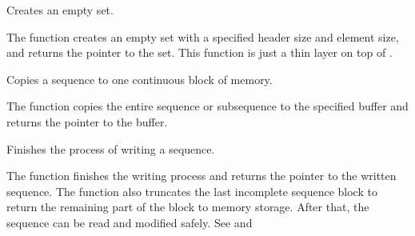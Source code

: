 Creates an empty set.


\begin{description}
\end{description}

The function creates an empty set with a specified header size and element size, and returns the pointer to the set. This function is just a thin layer on top of .

Copies a sequence to one continuous block of memory.


\begin{description}
\end{description}

The function copies the entire sequence or subsequence to the specified buffer and returns the pointer to the buffer.

Finishes the process of writing a sequence.


\begin{description}
\end{description}


The function finishes the writing process and
returns the pointer to the written sequence. The function also truncates
the last incomplete sequence block to return the remaining part of the
block to memory storage. After that, the sequence can be read and
modified safely. See  and 

